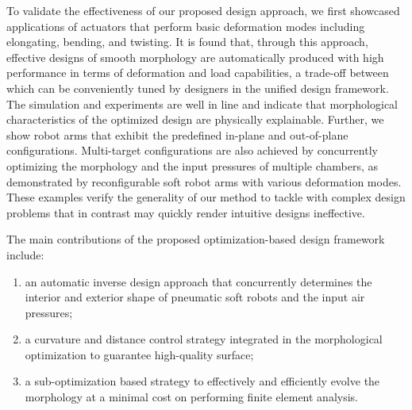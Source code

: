 \documentclass[journal]{IEEEtran}
\theoremstyle{definition}
\begin{document}
To validate the effectiveness of our proposed design approach, we first showcased applications of actuators that perform basic deformation modes including elongating, bending, and twisting. It is found that, through this approach, effective designs of smooth morphology are automatically produced with high performance in terms of deformation and load capabilities, a trade-off between which can be conveniently tuned by designers in the unified design framework. The simulation and experiments are well in line and indicate that morphological characteristics of the optimized design are physically explainable. Further, we show robot arms that exhibit the predefined in-plane and out-of-plane configurations. Multi-target configurations are also achieved by concurrently optimizing the morphology and the input pressures of multiple chambers, as demonstrated by reconfigurable soft robot arms with various deformation modes. These examples verify the generality of our method to tackle with complex design problems that in contrast may quickly render intuitive designs ineffective.

The main contributions of the proposed optimization-based design framework include:
\begin{enumerate}
  \item an automatic inverse design approach that concurrently determines the interior and exterior shape of pneumatic soft robots and the input air pressures;
  \item a curvature and distance control strategy integrated in the morphological optimization to guarantee high-quality surface;
  \item a sub-optimization based strategy to effectively and efficiently evolve the morphology at a minimal cost on performing finite element analysis.
\end{enumerate}
\end{document}
